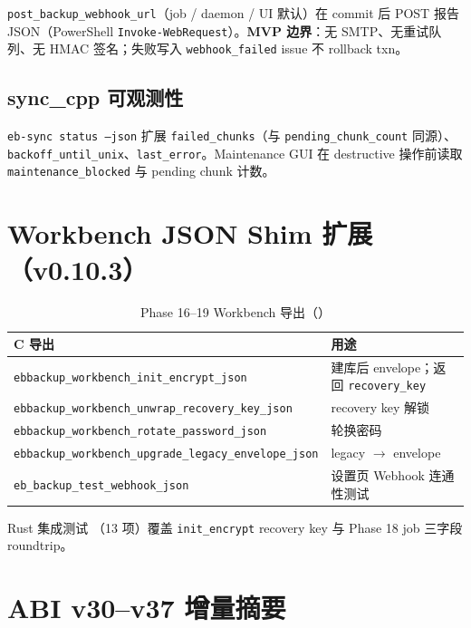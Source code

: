 \texttt{post\_backup\_webhook\_url}（job / daemon / UI 默认）在 commit 后 POST 报告 JSON（PowerShell \texttt{Invoke-WebRequest}）。\textbf{MVP 边界}：无 SMTP、无重试队列、无 HMAC 签名；失败写入 \texttt{webhook\_failed} issue 不 rollback txn。

\subsection{sync\_cpp 可观测性}

\texttt{eb-sync status --json} 扩展 \texttt{failed\_chunks}（与 \texttt{pending\_chunk\_count} 同源）、\texttt{backoff\_until\_unix}、\texttt{last\_error}。Maintenance GUI 在 destructive 操作前读取 \texttt{maintenance\_blocked} 与 pending chunk 计数。

\section{Workbench JSON Shim 扩展（v0.10.3）}
\label{sec:workbench-shim-v37}

\begin{longtable}{@{}lp{8.5cm}@{}}
\caption{Phase 16--19 Workbench 导出（）} \\
\toprule
C 导出 & 用途 \\
\midrule
\texttt{ebbackup\_workbench\_init\_encrypt\_json} & 建库后 envelope；返回 \texttt{recovery\_key} \\
\texttt{ebbackup\_workbench\_unwrap\_recovery\_key\_json} & recovery key 解锁 \\
\texttt{ebbackup\_workbench\_rotate\_password\_json} & 轮换密码 \\
\texttt{ebbackup\_workbench\_upgrade\_legacy\_envelope\_json} & legacy $\rightarrow$ envelope \\
\texttt{eb\_backup\_test\_webhook\_json} & 设置页 Webhook 连通性测试 \\
\bottomrule
\end{longtable}

Rust 集成测试 （13 项）覆盖 \texttt{init\_encrypt} recovery key 与 Phase 18 job 三字段 roundtrip。

\section{ABI v30--v37 增量摘要}

